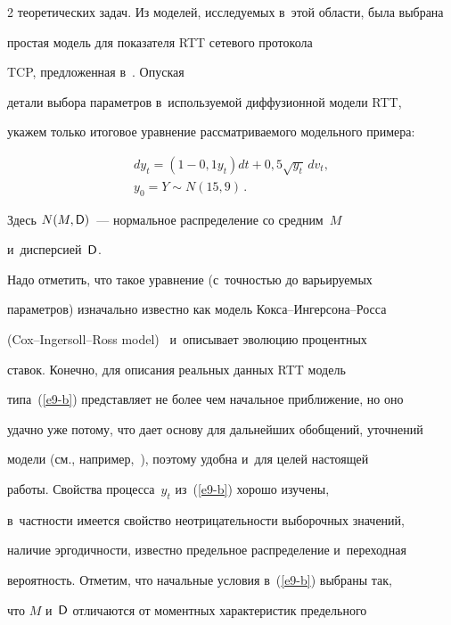\begin{multicols}{2}
теоретических задач. Из моделей, исследуемых в~этой области, была выбрана 


простая модель для показателя RTT сетевого протокола 


TCP, предложенная в~\cite{3-b}. Опуская 


детали выбора параметров в~используемой диффузионной модели RTT, 


укажем только итоговое уравнение рассматриваемого модельного примера:


     \begin{multline}


     dy_t= \left( 1-0{,}1y_t\right) dt+0{,}5\sqrt{y_t}\,dv_t,\\ y_0=Y\sim 


N(15,9)\,.


     \label{e9-b}


     \end{multline}


Здесь $N(M,{\sf D})$~--- нормальное распределение со средним~$M$ 


и~дисперсией~${\sf D}$.


     


     Надо отметить, что такое уравнение (с~точ\-ностью до варьируемых 


параметров) изначально известно как модель Кок\-са--Ин\-гер\-со\-на--Рос\-са 


(Cox--Ingersoll--Ross model)~\cite{4-b} и~описывает эволюцию процентных 


ставок. Конечно, для описания реальных данных RTT модель  


типа~(\ref{e9-b}) представляет не более чем начальное приближение, но оно 


удачно уже потому, что дает основу для дальнейших обобщений, уточнений 


модели (см., например,~\cite{5-b}), поэтому удобна и~для целей настоящей 


работы. Свойства процесса~$y_t$ из~(\ref{e9-b}) хорошо изучены, 


в~частности имеется свойство неотрицательности выборочных значений, 


наличие эргодичности, известно предельное распределение и~переходная 


вероятность. Отметим, что начальные условия в~(\ref{e9-b}) выбраны так, 


что $M$ и~${\sf D}$ отличаются от моментных характеристик предельного 



\end{multicols}
